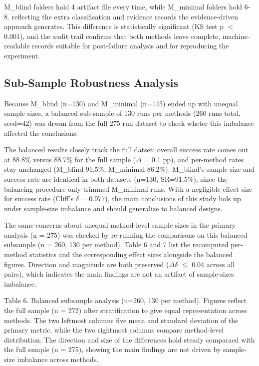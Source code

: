 \documentclass[conference]{IEEEtran}
\begin{document}
M\_blind  folders hold 4 artifact file every time, while M\_minimal folders hold 6-8. reflecting the extra classification and evidence records the evidence-driven approach generates. This difference is statistically significant (KS test p $<$ 0.001), and the audit trail confirms that both methods leave complete, machine-readable records suitable for post-failure analysis and for reproducing the experiment.

\subsection{Sub-Sample Robustness Analysis}

Because M\_blind (n=130) and M\_minimal (n=145) ended up with unequal sample sizes, a balanced sub-sample of 130 runs per methods (260 runs total, seed=42) was drwan from the full 275 run dataset to check wheter this imbalance affected the conclusions.

The balanced results closely track the full datset: overall success rate comes out at 88.8\% versus 88.7\% for the full sample ($\Delta$ = 0.1 pp), and per-method rates stay unchanged (M\_blind 91.5\%, M\_minimal 86.2\%). M\_blind's sample size and success rate are identical in both datasets (n=130, SR=91.5\%), since the balancing procedure only trimmed M\_minimal runs. With a negligible effect size for success rate (Cliff's $\delta$ = 0.977), the main conclusions of this study hols up under sample-size imbalance and should generalize to balanced designs.

The same concerns about unequal method-level sample sizes  in the primary analysis (n = 275) was checked by re-running the comparisons on this balanced subsample (n = 260, 130 per method). Table 6 and 7  list the recomputed per-method statistics and the corresponding effect sizes alongside the balanced figures. Direction and magnitude are both preserved ($\Delta$$\delta$ $\leq$ 0.04 across all pairs), which indicates the main findings are not an artifact of sample-sizes imbalance.

Table 6. Balanced subsample analysis (n=260, 130 per method). Figures reflect the full sample (n = 272) after stratification to give equal representation across methods. The two leftmost columns five mean and standard deviation of the primary metric, while the two rightmost columns compare method-level distribution. The direction and size of the differences hold steady comparaed with the full smaple (n = 275), showing the main findings are not driven by sample-size imbalance across methods.
\end{document}
